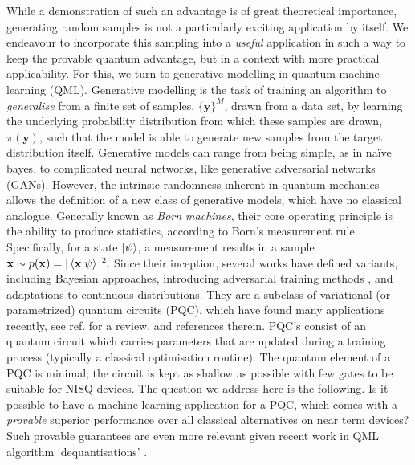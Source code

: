 While a demonstration of such an advantage is of great theoretical importance, generating random samples is not a particularly exciting application by itself. We endeavour to incorporate this sampling into a \textit{useful} application in such a way to keep the provable quantum advantage, but in a context with more practical applicability. For this, we turn to generative modelling in quantum machine learning (QML). Generative modelling is the task of training an algorithm to \textit{generalise} from a finite set of samples, $\{\mathbf{y}\}^M$, drawn from a data set, by learning the underlying probability distribution from which these samples are drawn, $\pi(\mathbf{y})$, such that the model is able to generate new samples from the target distribution itself. Generative models can range from being simple, as in na{\"i}ve bayes\cite{maron_automatic_1961}, to complicated neural networks, like generative adversarial networks (GANs)\cite{goodfellow_generative_2014}. However, the intrinsic randomness inherent in quantum mechanics allows the definition of a new class of generative models, which have no classical analogue. Generally known as \textit{Born machines}\cite{cheng_information_2017, liu_differentiable_2018}, their core operating principle is the ability to produce statistics, according to Born's measurement rule. Specifically, for a state $\ket{\psi}$, a measurement results in a sample $\mathbf{x} \sim p(\mathbf{x}) = |\braket{\mathbf{x}|\psi}|^2 \label{bornrule}$. Since their inception, several works have defined variants, including Bayesian approaches\cite{du_expressive_2018}, introducing adversarial training methods \cite{zeng_learning_2018}, and adaptations to continuous distributions\cite{romero_variational_2019}. They are a subclass of variational (or parametrized) quantum circuits (PQC), which have found many applications recently, see ref. \cite{benedetti_parameterized_2019} for a review, and references therein. PQC's consist of an quantum circuit which carries parameters that are updated during a training process (typically a classical optimisation routine). The quantum element of a PQC is minimal; the circuit is kept as shallow as possible with few gates to be suitable for NISQ devices. The question we address here is the following. Is it possible to have a machine learning application for a PQC, which comes with a \textit{provable} superior performance over all classical alternatives on near term devices? Such provable guarantees are even more relevant given recent work in QML algorithm `dequantisations' \cite{tang_quantum-inspired_2018, tang_quantum-inspired_2018-1, andoni_solving_2018, chia_quantum-inspired_2018, gilyen_quantum-inspired_2018}. 

